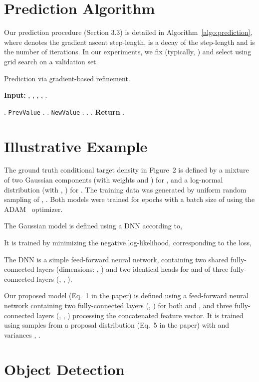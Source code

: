 \documentclass[runningheads]{llncs}
\begin{document}
\appendix
\begin{appendices}
\renewcommand{\thesection}{\appendixname~\Alph{section}}
\renewcommand{\thesubsection}{\Alph{section}.\arabic{subsection}}
\section{Prediction Algorithm}
\label{appendix:prediction}
Our prediction procedure (Section 3.3) is detailed in Algorithm~\ref{algo:prediction}, where  denotes the gradient ascent step-length,  is a decay of the step-length and  is the number of iterations. In our experiments, we fix  (typically, ) and select  using grid search on a validation set.

\begin{algorithm}
\caption{Prediction via gradient-based refinement.}
\label{algo:prediction}
\textbf{Input:} , , , , .
\begin{algorithmic}[1]
    \State .
    \For{\texttt{}}
        \State \texttt{PrevValue}  .
        \State .
        \State \texttt{NewValue}  .
        \If { }
            \State .
        \Else
            \State .
        \EndIf
    \EndFor
    \State \textbf{Return} .
\end{algorithmic}
\end{algorithm}\vspace{-3mm} \section{Illustrative Example}
\label{appendix:illustrative_example}

The ground truth conditional target density  in Figure~2 is defined by a mixture of two Gaussian components (with weights  and ) for , and a log-normal distribution (with , ) for . The training data  was generated by uniform random sampling of , . Both models were trained for  epochs with a batch size of  using the ADAM~\cite{kingma2014adam} optimizer.

The Gaussian model is defined using a DNN  according to,

It is trained by minimizing the negative log-likelihood, corresponding to the loss,

The DNN  is a simple feed-forward neural network, containing two shared fully-connected layers (dimensions: , ) and two identical heads for  and  of three fully-connected layers (, , ).

Our proposed model  (Eq.~1 in the paper) is defined using a feed-forward neural network  containing two fully-connected layers (, ) for both  and , and three fully-connected layers (, , ) processing the concatenated  feature vector. It is trained using  samples from a proposal distribution  (Eq.~5 in the paper) with  and variances , . \section{Object Detection}
\label{appendix:object_detection}


\end{appendices}
\end{document}
